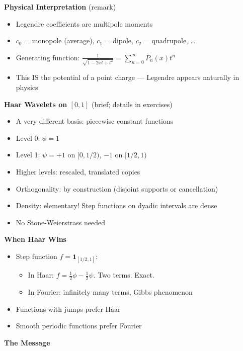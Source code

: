 \documentclass[
  10pt,
  letterpaper,
]{scrbook}
\providecommand{\tightlist}{%
  \setlength{\itemsep}{0pt}\setlength{\parskip}{0pt}}
\begin{document}
\textbf{Physical Interpretation} (remark)

\begin{itemize}
\tightlist
\item
  Legendre coefficients are multipole moments
\item
  \(c_0\) = monopole (average), \(c_1\) = dipole, \(c_2\) = quadrupole,
  \ldots{}
\item
  Generating function:
  \(\frac{1}{\sqrt{1-2xt+t^2}} = \sum_{n=0}^\infty P_n(x) t^n\)
\item
  This IS the potential of a point charge --- Legendre appears naturally
  in physics
\end{itemize}

\textbf{Haar Wavelets on \([0,1]\)} (brief; details in exercises)

\begin{itemize}
\tightlist
\item
  A very different basis: piecewise constant functions
\item
  Level 0: \(\phi = 1\)
\item
  Level 1: \(\psi = +1\) on \([0, 1/2)\), \(-1\) on \([1/2, 1)\)
\item
  Higher levels: rescaled, translated copies
\item
  Orthogonality: by construction (disjoint supports or cancellation)
\item
  Density: elementary! Step functions on dyadic intervals are dense
\item
  No Stone-Weierstrass needed
\end{itemize}

\textbf{When Haar Wins}

\begin{itemize}
\tightlist
\item
  Step function \(f = \mathbf{1}_{[1/2,1]}\):

  \begin{itemize}
  \tightlist
  \item
    In Haar: \(f = \frac{1}{2}\phi - \frac{1}{2}\psi\). Two terms.
    Exact.
  \item
    In Fourier: infinitely many terms, Gibbs phenomenon
  \end{itemize}
\item
  Functions with jumps prefer Haar
\item
  Smooth periodic functions prefer Fourier
\end{itemize}

\textbf{The Message}
\end{document}
